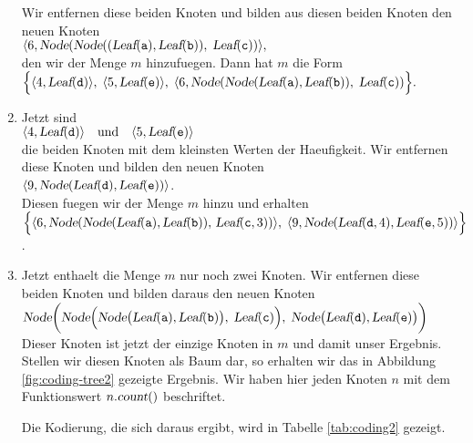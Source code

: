 \begin{enumerate}
      Wir entfernen diese beiden Knoten und bilden aus diesen beiden Knoten den neuen Knoten
      \\[0.2cm]
      \hspace*{1.3cm}
      $ \langle 6, \textsl{Node}(
           \textsl{Node}((\textsl{Leaf}(\mathtt{a}), \textsl{Leaf}(\mathtt{b})),\; 
           \textsl{Leaf}(\mathtt{c}))\rangle, $
      \\[0.2cm]
      den wir der Menge $m$ hinzufuegen.  Dann hat $m$ die Form
      \\[0.2cm]
      \hspace*{1.3cm}
      $ \Bigl\{ 
        \langle 4, \textsl{Leaf}(\mathtt{d}) \rangle,\;\langle 5, \textsl{Leaf}(\mathtt{e}) \rangle,\;
        \langle 6, \textsl{Node}(
           \textsl{Node}(\textsl{Leaf}(\mathtt{a}), \textsl{Leaf}(\mathtt{b})),\; 
           \textsl{Leaf}(\mathtt{c}))\Bigr\}. $
\item Jetzt sind 
      \\[0.2cm]
      \hspace*{1.3cm}
      $ \langle 4, \textsl{Leaf}(\mathtt{d}) \rangle \quad \mathrm{und} \quad \langle 5, \textsl{Leaf}(\mathtt{e}) \rangle$
      \\[0.2cm]
      die beiden Knoten mit dem kleinsten Werten der Haeufigkeit.
      Wir entfernen diese Knoten und bilden den neuen Knoten \\[0.2cm]
      \hspace*{1.3cm}
      $\langle 9, \textsl{Node}(\textsl{Leaf}(\mathtt{d}), \textsl{Leaf}(\mathtt{e})) \rangle$.
      \\[0.2cm]
      Diesen fuegen wir der Menge $m$ hinzu und erhalten
      \\[0.2cm]
      \hspace*{1.3cm}
      $ \Bigl\{ 
        \langle 6, \textsl{Node}(
           \textsl{Node}(\textsl{Leaf}(\mathtt{a}),
           \textsl{Leaf}(\mathtt{b})),\,\textsl{Leaf}(\mathtt{c},3))
        \rangle,\;
        \langle 9,\textsl{Node}(\textsl{Leaf}(\mathtt{d},4), \textsl{Leaf}(\mathtt{e},5)) \rangle
        \Bigr\}
           $.      
\item Jetzt enthaelt die Menge $m$ nur noch zwei Knoten.  Wir entfernen diese beiden Knoten und
      bilden daraus den neuen Knoten
      \\[0.2cm]
      \hspace*{1.3cm}
      $\textsl{Node}\biggl(
              \textsl{Node}\Bigl(
                 \textsl{Node}\bigl(\textsl{Leaf}(\mathtt{a}), \textsl{Leaf}(\mathtt{b})\bigr),\; 
                 \textsl{Leaf}(\mathtt{c})\Bigr),\;
              \textsl{Node}\bigl(\textsl{Leaf}(\mathtt{d}), \textsl{Leaf}(\mathtt{e})\bigr)
         \biggr)
      $
      \\[0.2cm]
      Dieser Knoten ist jetzt der einzige Knoten in $m$ und damit unser Ergebnis.
      Stellen wir diesen Knoten als Baum dar, so erhalten wir das in Abbildung
      \ref{fig:coding-tree2} gezeigte Ergebnis.  Wir haben hier jeden Knoten $n$
      mit dem Funktionswert  $n.\textsl{count}()$ beschriftet.  

      Die Kodierung, die sich daraus ergibt,
      wird in Tabelle \ref{tab:coding2} gezeigt.
\end{enumerate}

